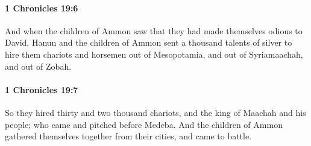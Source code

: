 		\paragraph{1 Chronicles 19:6} %
			\label{1CHRONICLES-19-6}

			And when the children of Ammon saw that they had made themselves odious to David, Hanun and the children of Ammon sent a thousand talents of silver to hire them chariots and horsemen out of Mesopotamia, and out of Syriamaachah, and out of Zobah.


		\paragraph{1 Chronicles 19:7} %
			\label{1CHRONICLES-19-7}

			So they hired thirty and two thousand chariots, and the king of Maachah and his people; who came and pitched before Medeba. And the children of Ammon gathered themselves together from their cities, and came to battle.

